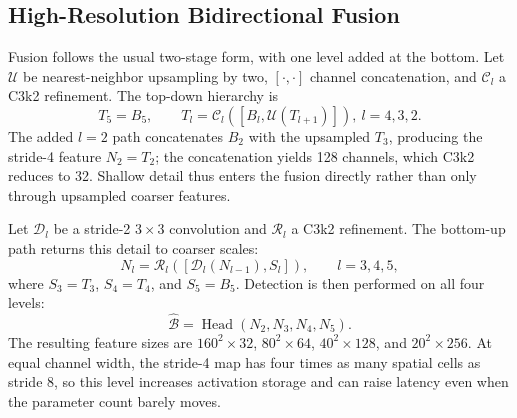 \documentclass[lettersize,journal]{IEEEtran}
\begin{document}
\subsection{High-Resolution Bidirectional Fusion}
Fusion follows the usual two-stage form, with one level added at the bottom. Let $\mathcal U$ be nearest-neighbor upsampling by two, $[\cdot,\cdot]$ channel concatenation, and $\mathcal C_l$ a C3k2 refinement. The top-down hierarchy is
\begin{equation}
T_5=B_5,\qquad T_l=\mathcal C_l([B_l,\mathcal U(T_{l+1})]),\ l=4,3,2.
\label{eq:topdown}
\end{equation}
The added $l=2$ path concatenates $B_2$ with the upsampled $T_3$, producing the stride-4 feature $N_2=T_2$; the concatenation yields 128 channels, which C3k2 reduces to 32. Shallow detail thus enters the fusion directly rather than only through upsampled coarser features.

Let $\mathcal D_l$ be a stride-2 $3\times3$ convolution and $\mathcal R_l$ a C3k2 refinement. The bottom-up path returns this detail to coarser scales:
\begin{equation}
N_l=\mathcal R_l([\mathcal D_l(N_{l-1}),S_l]),\qquad l=3,4,5,
\label{eq:bottomup}
\end{equation}
where $S_3=T_3$, $S_4=T_4$, and $S_5=B_5$. Detection is then performed on all four levels:
\begin{equation}
\widehat{\mathcal B}=\operatorname{Head}(N_2,N_3,N_4,N_5).
\label{eq:head}
\end{equation}
The resulting feature sizes are $160^2\times32$, $80^2\times64$, $40^2\times128$, and $20^2\times256$. At equal channel width, the stride-4 map has four times as many spatial cells as stride 8, so this level increases activation storage and can raise latency even when the parameter count barely moves.
\end{document}
